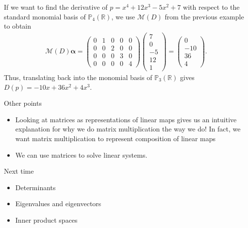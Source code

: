 \documentclass [aspectratio=169]{beamer}
\newcommand{\R}{{\mathbb{R}}}
\begin{document}
\begin{frame}
\begin{example}
If we want to find the derivative of $p= x^4 +12x^3 -5x^2 +7$ with respect to the standard monomial basis of $\mathbb{P}_4(\R)$, we use $\mathcal{M}(D)$ from the previous example to obtain
\begin{align*}
    \mathcal{M}(D)\boldsymbol{\alpha} = \begin{pmatrix}
    0 & 1 & 0 & 0 & 0 \\
    0 & 0 & 2 & 0 & 0 \\
    0 & 0 & 0 & 3 & 0 \\
    0 & 0 & 0 & 0 & 4
     \end{pmatrix} \begin{pmatrix} 7\\ 0\\ -5\\12\\1
     \end{pmatrix} = \begin{pmatrix} 0 \\ -10\\ 36\\4
     \end{pmatrix}.
\end{align*}
Thus, translating back into the monomial basis of $\mathbb{P}_3(\R)$ gives $D(p) = -10x + 36x^2 +4x^3$.
\end{example}

\end{frame}

\begin{frame}{Other points}
\begin{itemize}
\item Looking at matrices as representations of linear maps gives us an intuitive explanation for why we do matrix multiplication the way we do! In fact, we want matrix multiplication to represent composition of linear maps
\item We can use matrices to solve linear systems.
\end{itemize}
\end{frame}

\begin{frame}{Next time}
    \begin{itemize}
      \setlength\itemsep{0.5em}
    	\item Determinants
	\item Eigenvalues and eigenvectors
	\item Inner product spaces
    \end{itemize}
\end{frame}
\end{document}
